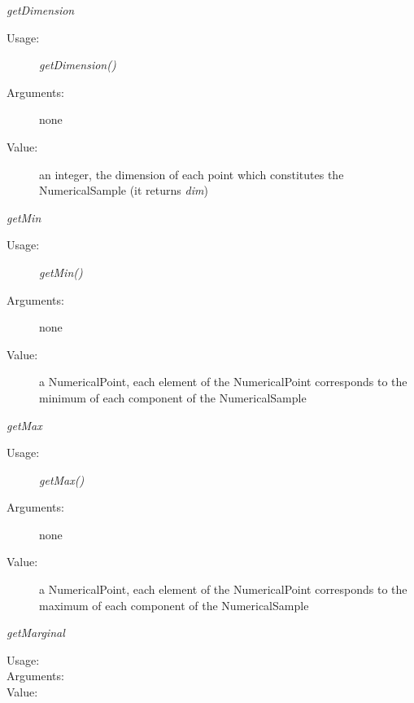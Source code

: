 \begin{description}
\begin{description}
\item \textit{getDimension}
\begin{description}
\item[Usage:] \textit{getDimension()}
\item[Arguments:] none
\item[Value:] an integer, the dimension of each point which constitutes the NumericalSample (it returns \textit{dim})
\end{description}
\bigskip

\item \textit{getMin}
\begin{description}
\item[Usage:] \textit{getMin()}
\item[Arguments:] none
\item[Value:] a NumericalPoint,
each element of the NumericalPoint corresponds to the minimum of each component of
the NumericalSample
\end{description}
\bigskip

\item \textit{getMax}
\begin{description}
\item[Usage:] \textit{getMax()}
\item[Arguments:] none
\item[Value:] a NumericalPoint, each element of the NumericalPoint corresponds to the maximum of each component of the NumericalSample
\end{description}
\bigskip

\item \textit{getMarginal}
\begin{description}
\item[Usage:] \rule{0pt}{1em}
\item[Arguments:] \rule{0pt}{1em}
\item[Value:] \rule{0pt}{1em}
\end{description}
\bigskip


\end{description}
\end{description}
